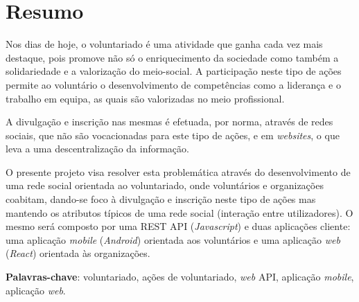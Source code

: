 \section*{Resumo}
Nos dias de hoje, o voluntariado é uma atividade que ganha cada vez mais destaque, pois promove não só o enriquecimento da sociedade como também a solidariedade e a valorização do meio-social. A participação neste tipo de ações permite ao voluntário o desenvolvimento de competências como a liderança e o trabalho em equipa, as quais são valorizadas no meio profissional. \par \smallskip
A divulgação e inscrição nas mesmas é efetuada, por norma, através de redes sociais, que não são vocacionadas para este tipo de ações, e em \textit{websites}, o que leva a uma descentralização da informação. \par \smallskip
O presente projeto visa resolver esta problemática através do desenvolvimento de uma rede social orientada ao voluntariado, onde voluntários e organizações coabitam, dando-se foco à divulgação e inscrição neste tipo de ações mas mantendo os atributos típicos de uma rede social (interação entre utilizadores). O mesmo será composto por uma REST API (\textit{Javascript}) e duas aplicações cliente: uma aplicação \textit{mobile} (\textit{Android}) orientada aos voluntários e uma aplicação \textit{web} (\textit{React}) orientada às organizações. \par \smallskip
\textbf{Palavras-chave}: voluntariado, ações de voluntariado, \textit{web} API, aplicação \textit{mobile}, aplicação \textit{web}.